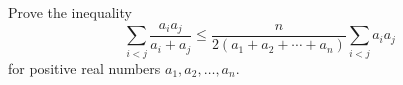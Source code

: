 Prove the inequality
\[
\sum_{i<j} \frac{a_i a_j}{a_i + a_j} \leq \frac{n}{2(a_1 + a_2 + \cdots + a_n)} \sum_{i<j} a_i a_j
\]
for positive real numbers $a_1, a_2, \ldots, a_n$.
